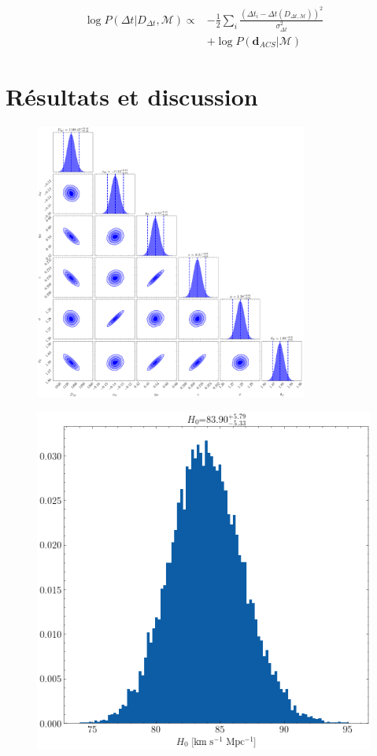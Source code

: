 \documentclass[times,10pt,twocolumn]{article}
\begin{document}
\begin{align}
\nonumber
        \log P(\Delta t | D_{\Delta t}, \mathcal{M}) \propto 
        &-\frac{1}{2} \sum_i \frac{(\Delta t_i - \Delta t(D_{\Delta t, \mathcal{M}}))^{2}}{\sigma_{\Delta t}^{2}}
        \\\label{eq:JointLikelihood}
        &+\log P(\mathbf{d}_{ACS} | \mathcal{M})
\end{align}

\section{Résultats et discussion}\label{sec:resultats}
\begin{figure}[hb]
        \centering
        \includegraphics[width=0.8\textwidth]{corner_plot_joint}
        \caption{}
        \label{fig:cornerplot}
\end{figure}

\begin{figure}[H]
        \centering
        \includegraphics[width=0.8\linewidth]{marginalized_posterior_H0}
        \caption{}
        \label{fig:}
\end{figure}
\end{document}
